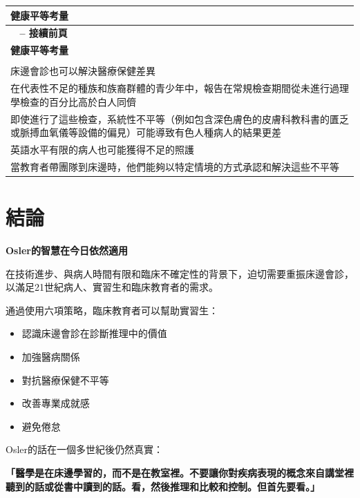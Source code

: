 \documentclass[12pt,a4paper]{article}
\begin{document}
\begin{longtable}{>{\raggedright\arraybackslash}p{15cm}}
\toprule
\textbf{\textcolor{emergency_blue}{健康平等考量}} \\
\midrule
\endfirsthead

\multicolumn{1}{c}%
{{\bfseries \tablename\ \thetable{} -- 接續前頁}} \\
\toprule
\textbf{\textcolor{emergency_blue}{健康平等考量}} \\
\midrule
\endhead

\midrule \multicolumn{1}{r}{{接續下頁}} \\ \midrule
\endfoot

\bottomrule
\endlastfoot

床邊會診也可以解決醫療保健差異 \\

在代表性不足的種族和族裔群體的青少年中，報告在常規檢查期間從未進行過理學檢查的百分比高於白人同儕 \\

即使進行了這些檢查，系統性不平等（例如包含深色膚色的皮膚科教科書的匱乏或脈搏血氧儀等設備的偏見）可能導致有色人種病人的結果更差 \\

英語水平有限的病人也可能獲得不足的照護 \\

當教育者帶團隊到床邊時，他們能夠以特定情境的方式承認和解決這些不平等 \\
\end{longtable}

\section{結論}

\begin{importantbox}
\textbf{Osler的智慧在今日依然適用}

在技術進步、與病人時間有限和臨床不確定性的背景下，迫切需要重振床邊會診，以滿足21世紀病人、實習生和臨床教育者的需求。

通過使用六項策略，臨床教育者可以幫助實習生：
\begin{itemize}
\item 認識床邊會診在診斷推理中的價值
\item 加強醫病關係
\item 對抗醫療保健不平等
\item 改善專業成就感
\item 避免倦怠
\end{itemize}

Osler的話在一個多世紀後仍然真實：

\textbf{「醫學是在床邊學習的，而不是在教室裡。不要讓你對疾病表現的概念來自講堂裡聽到的話或從書中讀到的話。看，然後推理和比較和控制。但首先要看。」}
\end{importantbox}
\end{document}
